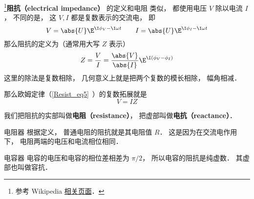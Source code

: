 
\begin{issues}
\issueDraft
\end{issues}


\footnote{参考 Wikipedia \href{https://en.wikipedia.org/wiki/Electrical_impedance}{相关页面}．}\textbf{阻抗（electrical impedance）} 的定义和电阻 类似， 都使用电压 $V$ 除以电流 $I$， 不同的是， 这 $V, I$ 都是复数表示的交流电， 即
\begin{equation}
V = \abs{U} \E^{\I \phi_V - \I \omega t}
\qquad
I = \abs{U} \E^{\I \phi_I - \I \omega t}
\end{equation}
那么阻抗的定义为（通常用大写 $Z$ 表示）
\begin{equation}
Z = \frac{V}{I} = \frac{\abs{V}}{\abs{I}} \E^{\I (\phi_V - \phi_I)}
\end{equation}
这里的除法是复数相除， 几何意义上就是把两个复数的模长相除， 幅角相减．

那么欧姆定律（\autoref{Resist_eq5}~）的复数拓展就是
\begin{equation}
V = IZ
\end{equation}

我们把阻抗的实部叫做\textbf{电阻（resistance）}， 把虚部叫做\textbf{电抗（reactance）}．

\begin{example}{电阻器}
根据定义， 普通电阻的阻抗就是其电阻值 $R$． 这是因为在交流电作用下， 电阻两端的电压和电流相位相同．
\end{example}

\begin{example}{电容器}
电容的电压和电容的相位差相差为 $\pi/2$， 所以电容的阻抗是纯虚数． 其虚部也叫做容抗．
\end{example}

